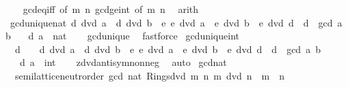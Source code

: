 \begin{isabellebody}
%
\isadelimproof
\ \ %
\endisadelimproof
%
\isatagproof
{}\isamarkupfalse%
\ gcd{\isacharunderscore}{\kern0pt}eq{\isacharunderscore}{\kern0pt}{}{\isacharunderscore}{\kern0pt}iff\ {\isacharbrackleft}{\kern0pt}of\ m\ n{\isacharbrackright}{\kern0pt}\ gcd{\isacharunderscore}{\kern0pt}ge{\isacharunderscore}{\kern0pt}{}{\isacharunderscore}{\kern0pt}int\ {\isacharbrackleft}{\kern0pt}of\ m\ n{\isacharbrackright}{\kern0pt}\ \isamarkupfalse%
\ arith%
\endisatagproof
{\isafoldproof}%
%
\isadelimproof
\isanewline
%
\endisadelimproof
\isanewline
{}\isamarkupfalse%
\ gcd{\isacharunderscore}{\kern0pt}unique{\isacharunderscore}{\kern0pt}nat{\isacharcolon}{\kern0pt}\ {\isachardoublequoteopen}d\ dvd\ a\ {\isasymand}\ d\ dvd\ b\ {\isasymand}\ {\isacharparenleft}{\kern0pt}{\isasymforall}e{\isachardot}{\kern0pt}\ e\ dvd\ a\ {\isasymand}\ e\ dvd\ b\ {\isasymlongrightarrow}\ e\ dvd\ d{\isacharparenright}{\kern0pt}\ {\isasymlongleftrightarrow}\ d\ {\isacharequal}{\kern0pt}\ gcd\ a\ b{\isachardoublequoteclose}\isanewline
\ \ \ d\ a\ {\isacharcolon}{\kern0pt}{\isacharcolon}{\kern0pt}\ nat\isanewline
%
\isadelimproof
\ \ %
\endisadelimproof
%
\isatagproof
{}\isamarkupfalse%
\ gcd{\isacharunderscore}{\kern0pt}unique\ \isamarkupfalse%
\ fastforce%
\endisatagproof
{\isafoldproof}%
%
\isadelimproof
\isanewline
%
\endisadelimproof
\isanewline
{}\isamarkupfalse%
\ gcd{\isacharunderscore}{\kern0pt}unique{\isacharunderscore}{\kern0pt}int{\isacharcolon}{\kern0pt}\isanewline
\ \ {\isachardoublequoteopen}d\ {\isasymge}\ {}\ {\isasymand}\ d\ dvd\ a\ {\isasymand}\ d\ dvd\ b\ {\isasymand}\ {\isacharparenleft}{\kern0pt}{\isasymforall}e{\isachardot}{\kern0pt}\ e\ dvd\ a\ {\isasymand}\ e\ dvd\ b\ {\isasymlongrightarrow}\ e\ dvd\ d{\isacharparenright}{\kern0pt}\ {\isasymlongleftrightarrow}\ d\ {\isacharequal}{\kern0pt}\ gcd\ a\ b{\isachardoublequoteclose}\isanewline
\ \ \ d\ a\ {\isacharcolon}{\kern0pt}{\isacharcolon}{\kern0pt}\ int\isanewline
%
\isadelimproof
\ \ %
\endisadelimproof
%
\isatagproof
{}\isamarkupfalse%
\ zdvd{\isacharunderscore}{\kern0pt}antisym{\isacharunderscore}{\kern0pt}nonneg\ \isamarkupfalse%
\ auto%
\endisatagproof
{\isafoldproof}%
%
\isadelimproof
\isanewline
%
\endisadelimproof
\isanewline
{}\isamarkupfalse%
\ gcd{\isacharunderscore}{\kern0pt}nat{\isacharcolon}{\kern0pt}\isanewline
\ \ semilattice{\isacharunderscore}{\kern0pt}neutr{\isacharunderscore}{\kern0pt}order\ gcd\ {\isachardoublequoteopen}{}{\isacharcolon}{\kern0pt}{\isacharcolon}{\kern0pt}nat{\isachardoublequoteclose}\ Rings{\isachardot}{\kern0pt}dvd\ {\isachardoublequoteopen}{\isasymlambda}m\ n{\isachardot}{\kern0pt}\ m\ dvd\ n\ {\isasymand}\ m\ {\isasymnoteq}\ n{\isachardoublequoteclose}\isanewline

\end{isabellebody}
